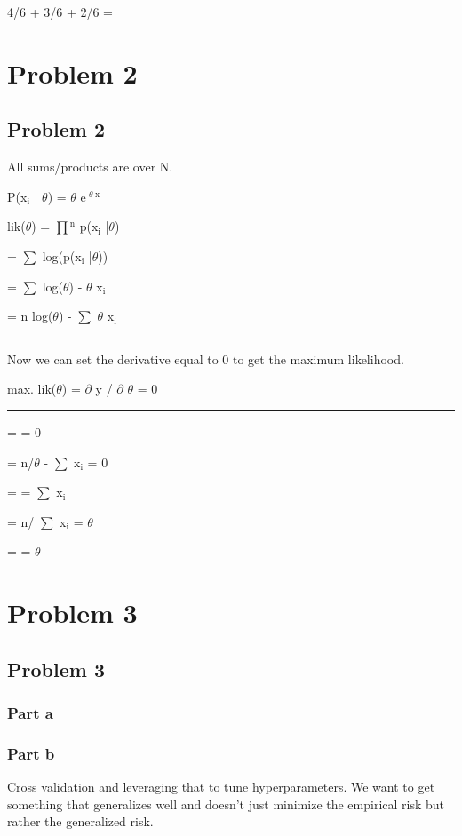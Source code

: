 \documentclass[11pt]{article}
\begin{document}
4/6 + 3/6 + 2/6 = 
\section{Problem 2}
\label{sec-2}

\subsection{Problem 2}
\label{sec-2-1}

All sums/products are over N.

P(x$_{\text{i}}$ | $\theta$) = $\theta$ e$^{\text{-}\theta\ \text{x}}$

lik($\theta$) = $\prod$$^{\text{n}}$ p(x$_{\text{i}}$ |$\theta$)

= $\sum$ log(p(x$_{\text{i}}$ |$\theta$))

= $\sum$ log($\theta$) - $\theta$ x$_{\text{i}}$

= n log($\theta$) - $\sum$ $\theta$ x$_{\text{i}}$

\rule{\linewidth}{0.5pt}

Now we can set the derivative equal to 0 to get the maximum likelihood.

max. lik($\theta$) = $\partial$ y / $\partial$ $\theta$ = 0

\rule{\linewidth}{0.5pt}

=  = 0

= n/$\theta$ - $\sum$ x$_{\text{i}}$ = 0

=  = $\sum$ x$_{\text{i}}$

= n/ $\sum$ x$_{\text{i}}$ = $\theta$

=  = $\theta$
\section{Problem 3}
\label{sec-3}

\subsection{Problem 3}
\label{sec-3-1}
\subsubsection{Part a}
\label{sec-3-1-1}

\subsubsection{Part b}
\label{sec-3-1-2}
Cross validation and leveraging that to tune hyperparameters. We want to get something that generalizes well and doesn't just minimize the empirical risk but rather the generalized risk.
\end{document}
